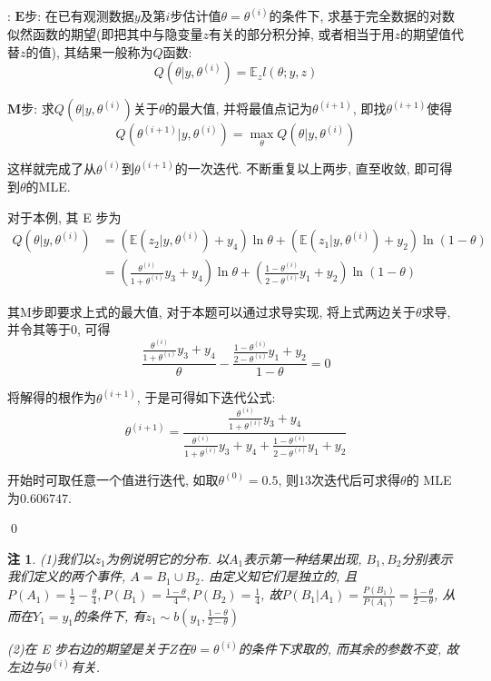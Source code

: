 \documentclass[a4paper,UTF8]{ctexart}
\theoremstyle{plain} \newtheorem{theorem}{定理}[section]
\theoremstyle{plain} \newtheorem{definition}{定义}[section]
\theoremstyle{plain} \newtheorem{lemma}{引理}[section]
\theoremstyle{plain} \newtheorem{proposition}{命题}[section]
\theoremstyle{plain} \newtheorem{example}{例}
\theoremstyle{plain} \newtheorem{remark}{注}
\theoremstyle{plain} \newtheorem{corollary}{推论}[section]
\newenvironment{mysolution}{{\color{blue} 解}: }{{\color{magenta}\qed}}
\begin{document}
\begin{mysolution}
$\mathbf{E}$步: 在已有观测数据$y$及第$i$步估计值$\theta = \theta^{(i)}$的条件下, 求基于完全数据的对数似然函数的期望(即把其中与隐变量$z$有关的部分积分掉, 或者相当于用$z$的期望值代替$z$的值), 其结果一般称为$Q$函数:
\begin{equation*}
Q(\theta | y, \theta^{(i)}) = \mathbb{E}_{z} l(\theta; y, z)
\end{equation*}

$\mathbf{M}$步: 求$Q(\theta | y, \theta^{(i)})$关于$\theta$的最大值, 并将最值点记为$\theta^{(i + 1)}$, 即找$\theta^{(i + 1)}$使得
\begin{equation*}
Q(\theta^{(i + 1)} | y, \theta^{(i)}) = \max_{\theta} Q(\theta | y, \theta^{(i)})
\end{equation*}

这样就完成了从$\theta^{(i)}$到$\theta^{(i + 1)}$的一次迭代. 不断重复以上两步, 直至收敛, 即可得到$\theta$的MLE.

对于本例, 其 E 步为
\begin{align*}
Q(\theta | y, \theta^{(i)}) & = \left( \mathbb{E}(z_{2} | y, \theta^{(i)}) + y_{4} \right) \ln \theta + \left( \mathbb{E}(z_{1} | y, \theta^{(i)}) + y_{2} \right) \ln (1 - \theta) \\
& = \left( \frac{\theta^{(i)}}{1 + \theta^{(i)}} y_{3} + y_{4} \right) \ln \theta + \left( \frac{1 - \theta^{(i)}}{2 - \theta^{(i)}} y_{1} + y_{2} \right) \ln (1 - \theta)
\end{align*}

其M步即要求上式的最大值, 对于本题可以通过求导实现, 将上式两边关于$\theta$求导, 并令其等于$0$, 可得
\begin{equation*}
\frac{\frac{\theta^{(i)}}{1 + \theta^{(i)}} y_{3} + y_{4}}{\theta} - \frac{\frac{1 - \theta^{(i)}}{2 - \theta^{(i)}} y_{1} + y_{2}}{1 - \theta} = 0
\end{equation*}

将解得的根作为$\theta^{(i + 1)}$, 于是可得如下迭代公式:
\begin{equation*}
\theta^{(i + 1)} = \frac{\frac{\theta^{(i)}}{1 + \theta^{(i)}} y_{3} + y_{4}}{\frac{\theta^{(i)}}{1 + \theta^{(i)}} y_{3} + y_{4} + \frac{1 - \theta^{(i)}}{2 - \theta^{(i)}} y_{1} + y_{2}}
\end{equation*}

开始时可取任意一个值进行迭代, 如取$\theta^{(0)} = 0.5$, 则$13$次迭代后可求得$\theta$的 MLE 为$0.606747$.


\end{mysolution}


\begin{remark}
(1)我们以$z_{1}$为例说明它的分布. 以$A_{1}$表示第一种结果出现, $B_{1}, B_{2}$分别表示我们定义的两个事件, $A = B_{1} \cup B_{2}$. 由定义知它们是独立的, 且$P(A_{1}) = \frac{1}{2} - \frac{\theta}{4}, P(B_{1}) = \frac{1 - \theta}{4}, P(B_{2}) = \frac{1}{4}$, 故$P(B_{1} | A_{1}) = \frac{P(B_1)}{P(A_1)} = \frac{1 - \theta}{2 - \theta}$, 从而在$Y_{1} = y_{1}$的条件下, 有$z_{1} \sim b \left( y_{1}, \frac{1 - \theta}{2 - \theta} \right)$

(2)在 E 步右边的期望是关于$Z$在$\theta = \theta^{(i)}$的条件下求取的, 而其余的参数不变, 故左边与$\theta^{(i)}$有关.
\end{remark}
\end{document}
